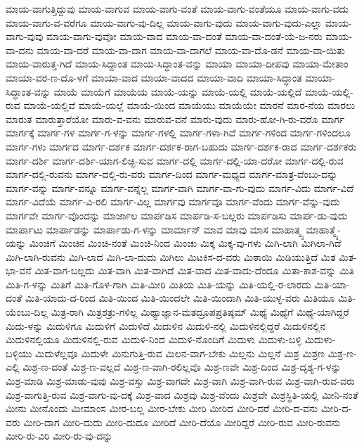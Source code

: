 {ಮಾಯ-ವಾಗುತ್ತಿದ್ದುವು
ಮಾಯ-ವಾಗುವ
ಮಾಯ-ವಾಗು-ವಂತೆ
ಮಾಯ-ವಾಗು-ವಂತೆಯೂ
ಮಾಯ-ವಾಗು-ವದು
ಮಾಯ-ವಾಗು-ವ-ವರೆಗೂ
ಮಾಯ-ವಾಗು-ವು-ದಿಲ್ಲ
ಮಾಯ-ವಾಗು-ವುದು
ಮಾಯ-ವಾಗು-ವುದು-ಎಲ್ಲಾ
ಮಾಯ-ವಾಗು-ವುವು
ಮಾಯ-ವಾಗು-ವುವೋ
ಮಾಯ-ವಾದ
ಮಾಯ-ವಾ-ದಂತೆ
ಮಾಯ-ವಾ-ದಂತೆ-ಯೆ-ಜ-ನರು
ಮಾಯ-ವಾ-ದನು
ಮಾಯ-ವಾ-ದರೆ
ಮಾಯ-ವಾ-ದಾಗ
ಮಾಯ-ವಾ-ದಾಗಲೆ
ಮಾಯ-ವಾ-ದೊ-ಡನೆ
ಮಾಯ-ವಾ-ಯಿತು
ಮಾಯ-ವಾರುತ್ತ-ಗಿದೆ
ಮಾಯ-ಸಿದ್ದಾಂತ
ಮಾಯ-ಸಿದ್ಧಾಂತ-ವನ್ನು
ಮಾಯಾ
ಮಾಯಾ-ದೀಪವು
ಮಾಯಾ-ಮೇತಾಂ
ಮಾಯಾ-ವರ-ಣ-ದೊ-ಳಗೆ
ಮಾಯಾ-ವಾದ
ಮಾಯಾ-ವಾದದ
ಮಾಯಾ-ವಾದಿ
ಮಾಯಾ-ಸಿದ್ಧಾಂತ
ಮಾಯಾ-ಸಿದ್ಧಾಂತ-ವನ್ನು
ಮಾಯೆ
ಮಾಯೆಗೆ
ಮಾಯೆಯ
ಮಾಯೆ-ಯನ್ನು
ಮಾಯೆ-ಯಲ್ಲಿ
ಮಾಯೆ-ಯಲ್ಲಿದೆ
ಮಾಯೆ-ಯಲ್ಲಿ-ರುವ
ಮಾಯೆ-ಯಲ್ಲಿವೆ
ಮಾಯೆ-ಯಲ್ಲೆ
ಮಾಯೆ-ಯಿಂದ
ಮಾಯೆಯು
ಮಾಯೆಯೇ
ಮಾರನೆ
ಮಾರ-ನೆಯ
ಮಾರಲು
ಮಾರುತ
ಮಾರುತ್ತಾರೆಯೋ
ಮಾರು-ವ-ವನು
ಮಾರುವ-ವನೆ
ಮಾರು-ವುದು
ಮಾರು-ಹೋ-ಗಿ-ರು-ವರೊ
ಮಾರ್ಗ
ಮಾರ್ಗಕ್ಕೆ
ಮಾರ್ಗ-ಗಳ
ಮಾರ್ಗ-ಗ-ಳನ್ನು
ಮಾರ್ಗ-ಗಳಲ್ಲಿ
ಮಾರ್ಗ-ಗಳಾ-ಗಿವೆ
ಮಾರ್ಗ-ಗಳಿಂದ
ಮಾರ್ಗ-ಗಳಿಂದಲೂ
ಮಾರ್ಗ-ಗಳು
ಮಾರ್ಗದ
ಮಾರ್ಗ-ದರ್ಶಕ
ಮಾರ್ಗ-ದರ್ಶಕ-ರಾಗ-ಬಹುದು
ಮಾರ್ಗ-ದರ್ಶಕ-ರಾದ
ಮಾರ್ಗ-ದರ್ಶಕರು
ಮಾರ್ಗ-ದರ್ಶಿ
ಮಾರ್ಗ-ದರ್ಶಿ-ಯಾಗ-ಲಿಚ್ಛಿ-ಸುವ
ಮಾರ್ಗ-ದಲ್ಲಿ
ಮಾರ್ಗ-ದಲ್ಲಿ-ಯಾ-ದರೋ
ಮಾರ್ಗ-ದಲ್ಲಿ-ರುವ
ಮಾರ್ಗ-ದಲ್ಲಿ-ರುವನು
ಮಾರ್ಗ-ದಲ್ಲಿ-ರು-ವರು
ಮಾರ್ಗ-ದಿಂದ
ಮಾರ್ಗ-ಮಧ್ಯದ
ಮಾರ್ಗ-ಮಾತ್ರ-ವೆಂಬು-ದನ್ನು
ಮಾರ್ಗ-ವನ್ನು
ಮಾರ್ಗ-ವನ್ನೂ
ಮಾರ್ಗ-ವನ್ನೆಲ್ಲ
ಮಾರ್ಗ-ವಾಗಿ
ಮಾರ್ಗ-ವಾ-ಗು-ವುದು
ಮಾರ್ಗ-ವಿದು
ಮಾರ್ಗ-ವಿದೆ
ಮಾರ್ಗ-ವಿದೆಯೆ
ಮಾರ್ಗ-ವಿ-ರಲಿ
ಮಾರ್ಗ-ವಿಲ್ಲ
ಮಾರ್ಗವು
ಮಾರ್ಗವೂ
ಮಾರ್ಗ-ವೆಂದು
ಮಾರ್ಗ-ವೆನ್ನು-ವುದು
ಮಾರ್ಗವೇ
ಮಾರ್ಗ-ವೊಂದನ್ನು
ಮಾರ್ಜಾಲ
ಮಾರ್ಪಡಿಸ
ಮಾರ್ಪಡಿ-ಸ-ಬಲ್ಲರು
ಮಾರ್ಪಡಿಸು
ಮಾರ್ಪ-ಡು-ವುದು
ಮಾರ್ಪಾಟು
ಮಾರ್ಪಾಡನ್ನು
ಮಾರ್ಪಾಡು-ಗ-ಳನ್ನು
ಮಾರ್ಮಾನ್
ಮಾವ
ಮಾವು
ಮಾಸ
ಮಾಹಾತ್ಮ್ಯ
ಮಾಹಾತ್ಮ್ಯೆ-ಯನ್ನು
ಮಿಂಚಿಗೆ
ಮಿಂಚಿನ
ಮಿಂಚಿ-ನಂತೆ
ಮಿಂಚಿ-ನಿಂದ
ಮಿಂಚು
ಮಿಕ್ಕ
ಮಿಕ್ಕ-ವು-ಗಳು
ಮಿಗಿ-ಲಾಗಿ
ಮಿಗಿಲಾ-ಗಿದೆ
ಮಿಗಿ-ಲಾಗಿ-ರುವನು
ಮಿಗಿ-ಲಾದ
ಮಿಗಿ-ಲಾ-ದುದು
ಮಿಗಿಲು
ಮಿಟಕಿಸ-ದ-ವರು
ಮಿಠಾಯಿ
ಮಿಡಿಯುತ್ತಿದೆ
ಮಿತ
ಮಿತ-ಭಾ-ವನೆ
ಮಿತ-ವಾಗ-ಬಲ್ಲದು
ಮಿತ-ವಾಗಿ
ಮಿತ-ವಾಗಿದೆ
ಮಿತ-ವಾದ
ಮಿತ-ವಾದು-ದೆಂದೂ
ಮಿತಾ-ಕಾಶ-ವನ್ನು
ಮಿತಿ
ಮಿತಿ-ಗ-ಳನ್ನು
ಮಿತಿಗೆ
ಮಿತಿ-ಗೊಳ-ಗಾಗಿ
ಮಿತಿ-ಮೀರಿ
ಮಿತಿಯ
ಮಿತಿ-ಯನ್ನು
ಮಿತಿ-ಯಲ್ಲಿ-ರ-ಲಾರದು
ಮಿತಿ-ಯಾ-ದಂತೆ
ಮಿತಿ-ಯಾದು-ದ-ರಿಂದ
ಮಿತಿ-ಯಿಂದ
ಮಿತಿ-ಯಿಂದಲೇ
ಮಿತಿ-ಯಿಂದಾಗಿ
ಮಿತಿ-ಯುಳ್ಳ-ವರು
ಮಿತಿಯೂ
ಮಿತಿ-ಯೆಂಬು-ದಿಲ್ಲ
ಮಿತ್ರ-ರಾಗಿ
ಮಿತ್ರಶತ್ರು-ಗಳಿಲ್ಲ
ಮಿಥ್ಯಾಜ್ಞಾನ-ಮತದ್ರೂಪಪ್ರತಿಷ್ಠಮ್
ಮಿಥ್ಯೆ
ಮಿಥ್ಯೆಗೆ
ಮಿಥ್ಯೆ-ಯಾಗಿದ್ದರೆ
ಮಿದು-ಳನ್ನು
ಮಿದುಳಿಗೂ
ಮಿದುಳಿಗೆ
ಮಿದುಳಿದೆ
ಮಿದುಳಿನ
ಮಿದುಳಿ-ನಲ್ಲಿ
ಮಿದುಳಿನಲ್ಲಿದ್ದರೆ
ಮಿದುಳಿನಲ್ಲಿನ
ಮಿದುಳಿನಲ್ಲಿಯೂ
ಮಿದುಳಿನಲ್ಲಿ-ರುವ
ಮಿದುಳಿ-ನಿಂದ
ಮಿದುಳಿ-ನೊಂದಿಗೆ
ಮಿದುಳು
ಮಿದುಳು-ಬಳ್ಳಿ
ಮಿದುಳು-ಬಳ್ಳಿಯು
ಮಿದುಳೆಲ್ಲವೂ
ಮಿದುಳೇ
ಮಿನುಗುತ್ತಿ-ರುವ
ಮಿಲನ-ವಾಗ-ಬೇಕು
ಮಿಲ್ಲನು
ಮಿಲ್ಲನೆ
ಮಿಶ್ರ
ಮಿಶ್ರಣ
ಮಿಶ್ರ-ಣ-ಎಲ್ಲಿ
ಮಿಶ್ರ-ಣ-ದಂತೆ
ಮಿಶ್ರ-ಣ-ವಲ್ಲದೆ
ಮಿಶ್ರ-ಣ-ವಾಗಿ-ರಲಿಲ್ಲವೊ
ಮಿಶ್ರ-ಣವೇ
ಮಿಶ್ರ-ದಿಂದ
ಮಿಶ್ರ-ದೃಶ್ಯ-ಗ-ಳನ್ನು
ಮಿಶ್ರ-ಮಾಡಿ
ಮಿಶ್ರ-ಮಾಡು-ವುವು
ಮಿಶ್ರ-ವಸ್ತು
ಮಿಶ್ರ-ವಾಗದೇ
ಮಿಶ್ರ-ವಾಗಿ
ಮಿಶ್ರ-ವಾಗಿ-ರುವ
ಮಿಶ್ರ-ವಾಗಿ-ರುವ-ವರು
ಮಿಶ್ರ-ವಾಗುತ್ತಿ-ರುವ
ಮಿಶ್ರ-ವಾಗು-ವು-ದಕ್ಕೆ
ಮಿಶ್ರ-ವಾದ
ಮಿಶ್ರವು
ಮಿಶ್ರ-ವೆಂದು
ಮಿಶ್ರವೇ
ಮಿಶ್ರಸ್ಥಿತಿ-ಯಲ್ಲಿ
ಮೀನಿ-ನಂತೆ
ಮೀನು
ಮೀನೊಂದು
ಮೀಮಾಂಸ
ಮೀರ-ಬಲ್ಲ
ಮೀರ-ಬೇಕು
ಮೀರಿ
ಮೀರಿದ
ಮೀರಿ-ದರೆ
ಮೀರಿ-ದ-ವನು
ಮೀರಿ-ದ-ವರು
ಮೀರಿ-ದಾಗ
ಮೀರಿ-ದುದು
ಮೀರಿ-ದುದೂ
ಮೀರಿದೆ
ಮೀರಿ-ದೆಯೊ
ಮೀರಿದ್ದರೆ
ಮೀರಿ-ರುವ
ಮೀರಿ-ರುವನು
ಮೀರಿ-ರು-ವಿರಿ
ಮೀರಿ-ರು-ವು-ದನ್ನು
}
